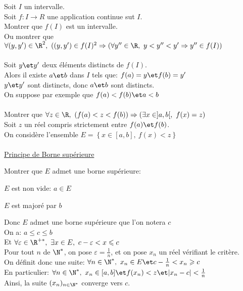 \documentclass[12pt,twoside,a4paper]{article}
\begin{document}
		\begin{preuve}
			Soit $I$ un intervalle.\\
			Soit $f:I\rightarrow R$ une application continue sut $I$.\\
			Montrer que $f(I)$ est un intervalle.\\
			Ou montrer que $\forall (y,y')\in \R^{2},\ ((y,y')\in f(I)^{2}\Rightarrow (\forall y''\in\R,\ y<y''<y'\Rightarrow y''\in f(I))$\\
			\\
			Soit $y\et y'$ deux \'el\'ements distincts de $f(I)$.\\
			Alors il existe $a\et b$ dans $I$ tels que: $f(a)=y\et f(b)=y'$\\
			$y\et y'$ sont distincts, donc $a\et b$ sont distincts.\\
			On suppose par exemple que $f(a)<f(b)\et a<b$\\
			\\
			Montrer que $\forall z\in\R,\ \left( f(a)<z<f(b)\right) \Rightarrow \left( \exists x\in ]a,b[,\ f(x)=z\right) $\\
			Soit $z$ un r\'eel compris strictement entre $f(a)\et f(b)$.\\
			On consid\`ere l'ensemble $E= \left\lbrace x\in [a,b],\ f(x)<z\right\rbrace $\\
			\\
			\underline{Principe de Borne sup\'erieure}
			\begin{tab}
				Montrer que $E$ admet une borne sup\'erieure:\begin{liste}
					\item $E$ est non vide: $a\in E$
					\item $E$ est major\'e par $b$
				\end{liste}
				Donc $E$ admet une borne sup\'erieure que l'on notera $c$\\
				On a: $a\leqslant c\leqslant b$\\
				Et $\forall \varepsilon \in\R^{+*},\ \exists x\in E,\ c-\varepsilon<x\leqslant c$\\
				Pour tout $n$ de $\N^{*}$, on pose $\varepsilon = \frac1{n}$, et on pose $x_n$ un r\'eel v\'erifiant le crit\`ere.\\
				On d\'efinit donc une suite: $\forall n\in\N^{*},\ x_n\in E\et c-\frac1{n}<x_n\geqslant c$\\
				En particulier: $\forall n\in\N^{*},\ x_n\in[a,b]\et f(x_n)<z\et |x_n-c|<\frac1{n}$\\
				Ainsi, la suite $(x_n)_{n\in\N^{*}}$ converge vers $c$.\\

\end{tab}
\end{preuve}
\end{document}
